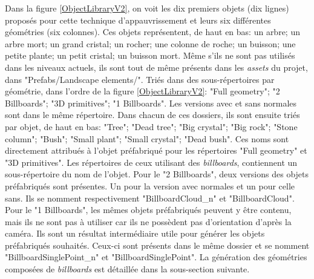 		Dans la figure \ref{ObjectLibraryV2}, on voit les dix premiers objets (dix lignes) proposés pour cette technique d'appauvrissement et leurs six différentes géométries (six colonnes). Ces objets représentent, de haut en bas: un arbre; un arbre mort; un grand cristal; un rocher; une colonne de roche; un buisson; une petite plante; un petit cristal; un buisson mort. Même s'ils ne sont pas utilisés dans les niveaux actuels, ils sont tout de même présents dans les \textit{assets} du projet, dans "Prefabs/Landscape elements/". Triés dans des sous-répertoires par géométrie, dans l'ordre de la figure \ref{ObjectLibraryV2}: "Full geometry"; "2 Billboards"; "3D primitives"; "1 Billboards". Les versions avec et sans normales sont dans le même répertoire. Dans chacun de ces dossiers, ils sont ensuite triés par objet, de haut en bas: "Tree"; "Dead tree"; "Big crystal"; "Big rock"; "Stone column"; "Bush"; "Small plant"; "Small crystal"; "Dead bush". Ces noms sont directement attribués à l'objet préfabriqué pour les répertoires "Full geometry" et "3D primitives". Les répertoires de ceux utilisant des \textit{billboards}, contiennent un sous-répertoire du nom de l'objet. Pour le "2 Billboards", deux versions des objets préfabriqués sont présentes. Un pour la version avec normales et un pour celle sans. Ils se nomment respectivement "BillboardCloud\_n" et "BillboardCloud". Pour le "1 Billboards", les mêmes objets préfabriqués peuvent y être contenu, mais ils ne sont pas à utiliser car ils ne possèdent pas d'orientation d'après la caméra. Ils sont un résultat intermédiaire utile pour générer les objets préfabriqués souhaités. Ceux-ci sont présents dans le même dossier et se nomment "BillboardSinglePoint\_n" et "BillboardSinglePoint". La génération des géométries composées de \textit{billboards} est détaillée dans la sous-section suivante.
		
